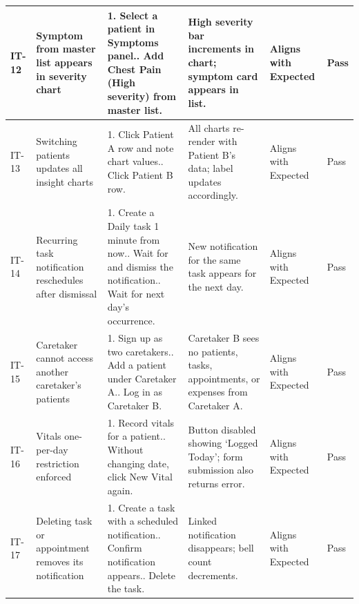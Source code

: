 \documentclass[12pt,a4paper]{article}
\begin{document}
\begin{longtable}{|p{1cm}|p{2.5cm}|p{3.5cm}|p{3.5cm}|p{2cm}|p{1.2cm}|}
    IT-12 & Symptom from master list appears in severity chart &
        1. Select a patient in Symptoms panel.\newline
        2. Add Chest Pain (High severity) from master list. &
        High severity bar increments in chart; symptom card appears in list. &
        Aligns with Expected & Pass \\
    \hline
 
    IT-13 & Switching patients updates all insight charts &
        1. Click Patient A row and note chart values.\newline
        2. Click Patient B row. &
        All charts re-render with Patient B's data; label updates accordingly. &
        Aligns with Expected & Pass \\
    \hline
 
    IT-14 & Recurring task notification reschedules after dismissal &
        1. Create a Daily task 1 minute from now.\newline
        2. Wait for and dismiss the notification.\newline
        3. Wait for next day's occurrence. &
        New notification for the same task appears for the next day. &
        Aligns with Expected & Pass \\
    \hline
 
    IT-15 & Caretaker cannot access another caretaker's patients &
        1. Sign up as two caretakers.\newline
        2. Add a patient under Caretaker A.\newline
        3. Log in as Caretaker B. &
        Caretaker B sees no patients, tasks, appointments, or expenses from Caretaker A. &
        Aligns with Expected & Pass \\
    \hline
 
    IT-16 & Vitals one-per-day restriction enforced &
        1. Record vitals for a patient.\newline
        2. Without changing date, click New Vital again. &
        Button disabled showing `Logged Today'; form submission also returns error. &
        Aligns with Expected & Pass \\
    \hline
 
    IT-17 & Deleting task or appointment removes its notification &
        1. Create a task with a scheduled notification.\newline
        2. Confirm notification appears.\newline
        3. Delete the task. &
        Linked notification disappears; bell count decrements. &
        Aligns with Expected & Pass \\
    \hline
 
\end{longtable}
\end{document}
